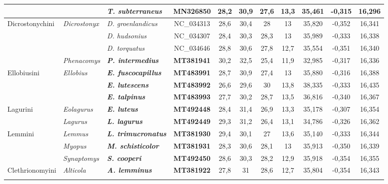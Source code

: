 \begin{landscape}
\begin{longtable}{|l|l|l|c|c|c|c|c|c|c|c|}
				&  & \textit{\textbf{T. subterraneus}} & \textbf{MN326850} & 28,2 & 30,9 & 27,6 & 13,3 & 35,461 & -0,315 & 16,296 \\ \hline
				\multirow{4}{*}{Dicrostonychini} & \multirow{3}{*}{\textit{Dicrostonyx}} & \textit{D. groenlandicus} & NC\_034313 & 28,6 & 30,4 & 28 & 13 & 35,820 & -0,352 & 16,341 \\ \cline{3-11} 
				&  & \textit{D. hudsonius} & NC\_034307 & 28,4 & 30,3 & 28,3 & 13 & 35,989 & -0,333 & 16,338 \\ \cline{3-11} 
				&  & \textit{D. torquatus} & NC\_034646 & 28,8 & 30,6 & 27,8 & 12,7 & 35,554 & -0,351 & 16,340 \\ \cline{2-11} 
				& \textit{Phenacomys} & \textit{\textbf{P. intermedius}} & \textbf{MT381941} & 30,2 & 32,5 & 25,4 & 11,9 & 32,985 & -0,317 & 16,336 \\ \hline
				\multirow{3}{*}{Ellobiusini} & \multirow{3}{*}{\textit{Ellobius}} & \textit{\textbf{E. fuscocapillus}} & \textbf{MT483991} & 28,7 & 30,9 & 27,4 & 13 & 35,880 & -0,316 & 16,388 \\ \cline{3-11} 
				&  & \textit{\textbf{E. lutescens}} & \textbf{MT483992} & 26,6 & 29,6 & 30 & 13,8 & 38,335 & -0,333 & 16,435 \\ \cline{3-11} 
				&  & \textit{\textbf{E. talpinus}} & \textbf{MT483993} & 27,7 & 30,2 & 28,7 & 13,5 & 36,816 & -0,340 & 16,367 \\ \hline
				\multirow{2}{*}{Lagurini} & \textit{Eolagurus} & \textit{\textbf{E. luteus}} & \textbf{MT492448} & 28,4 & 31,4 & 26,9 & 13,3 & 35,178 & -0,307 & 16,354 \\ \cline{2-11} 
				& \textit{Lagurus} & \textit{\textbf{L. lagurus}} & \textbf{MT492449} & 29,3 & 31,2 & 26,4 & 13,1 & 34,786 & -0,326 & 16,362 \\ \hline
				\multirow{3}{*}{Lemmini} & \textit{Lemmus} & \textit{\textbf{L. trimucronatus}} & \textbf{MT381930} & 29,4 & 30,1 & 27 & 13,6 & 35,140 & -0,333 & 16,344 \\ \cline{2-11} 
				& \textit{Myopus} & \textit{\textbf{M. schisticolor}} & \textbf{MT381931} & 28,3 & 30,6 & 28,1 & 13 & 35,913 & -0,350 & 16,339 \\ \cline{2-11} 
				& \textit{Synaptomys} & \textit{\textbf{S. cooperi}} & \textbf{MT492450} & 28,6 & 30,3 & 28,2 & 12,9 & 35,918 & -0,354 & 16,355 \\ \hline
				\multirow{14}{*}{Clethrionomyini} & \multirow{5}{*}{\textit{Alticola}} & \textit{\textbf{A. lemminus}} & \textbf{MT381922} & 27,8 & 31 & 28,6 & 12,7 & 35,804 & -0,354 & 16,343 \\ \cline{3-11} 

\end{longtable}
\end{landscape}
